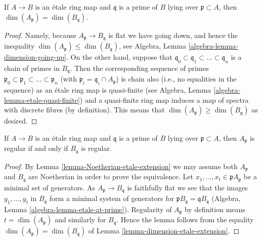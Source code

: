 \begin{lemma}
\label{lemma-dimension-etale-extension}
If $A \to B$ is an \'etale ring map and $\mathfrak q$ is a prime of
$B$ lying over $\mathfrak p \subset A$, then
$\dim(A_{\mathfrak p}) = \dim(B_{\mathfrak q})$.
\end{lemma}

\begin{proof}
Namely, because $A_{\mathfrak p} \to B_{\mathfrak q}$ is flat we have
going down, and hence the inequality
$\dim(A_{\mathfrak p}) \leq \dim(B_{\mathfrak q})$, see
Algebra, Lemma \ref{algebra-lemma-dimension-going-up}.
On the other hand, suppose that
$\mathfrak q_0 \subset \mathfrak q_1 \subset \ldots \subset \mathfrak q_n$
is a chain of primes in $B_{\mathfrak q}$. Then the corresponding
sequence of primes
$\mathfrak p_0 \subset \mathfrak p_1 \subset \ldots \subset \mathfrak p_n$
(with $\mathfrak p_i = \mathfrak q_i \cap A_{\mathfrak p}$) is chain
also (i.e., no equalities in the sequence) as an
\'etale ring map is quasi-finite (see
Algebra, Lemma \ref{algebra-lemma-etale-quasi-finite})
and a quasi-finite ring map induces a map of spectra with
discrete fibres (by definition).
This means that $\dim(A_{\mathfrak p}) \geq \dim(B_{\mathfrak q})$ as
desired.
\end{proof}

\begin{lemma}
\label{lemma-regular-etale-extension}
If $A \to B$ is an \'etale ring map and $\mathfrak q$ is a prime of
$B$ lying over $\mathfrak p \subset A$, then
$A_{\mathfrak p}$ is regular if and only if $B_{\mathfrak q}$ is regular.
\end{lemma}

\begin{proof}
By Lemma \ref{lemma-Noetherian-etale-extension}
we may assume both $A_\mathfrak p$ and $B_\mathfrak q$
are Noetherian in order to prove the equivalence.
Let $x_1, \ldots, x_t \in \mathfrak pA_\mathfrak p$
be a minimal set of generators. As $A_\mathfrak p \to B_\mathfrak q$
is faithfully flat we see that the images $y_1, \ldots, y_t$
in $B_\mathfrak q$ form a minimal system of generators for
$\mathfrak pB_\mathfrak q = \mathfrak q B_\mathfrak q$
(Algebra, Lemma \ref{algebra-lemma-etale-at-prime}).
Regularity of $A_\mathfrak p$ by definition means $t = \dim(A_\mathfrak p)$
and similarly for $B_\mathfrak q$. Hence the lemma follows from
the equality $\dim(A_\mathfrak p) = \dim(B_\mathfrak q)$
of Lemma \ref{lemma-dimension-etale-extension}.
\end{proof}

